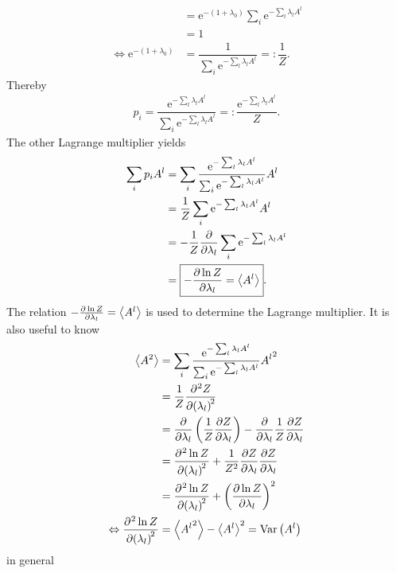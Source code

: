 \documentclass[a4paper,10pt]{article}
\numberwithin{equation}{section}
\begin{document}
\begin{multicols}{2}
\begin{align}
                 &= \text{e}^{-(1+\lambda _0)}\sum_{i}^{}\text{e}^{-\sum_{l}^{}\lambda _lA^l}\\
                 &= 1\\
  \Leftrightarrow \text{e}^{-(1+\lambda _0)} &= \dfrac{1}{\sum_{i}^{}\text{e}^{-\sum_{l}^{}\lambda _lA^l}}=:\dfrac{1}{Z}
.\end{align} 
Thereby
\begin{align} 
  \boxed{p_i=\dfrac{\text{e}^{-\sum_{l}^{}\lambda _lA^l}}{\sum_{i}^{}\text{e}^{-\sum_{l}^{}\lambda _lA^l}}=:\dfrac{\text{e}^{-\sum_{l}^{}\lambda _lA^l}}{Z}}
.\end{align} 
The other Lagrange multiplier yields
\begin{align} 
  \sum_{i}^{}p_iA^l &= \sum_{i}^{}\dfrac{\text{e}^{-\sum_{l}^{}\lambda _lA^l}}{\sum_{i}^{}\text{e}^{-\sum_{l}^{}\lambda _lA^l}}A^l\\
                      &= \dfrac{1}{Z}\sum_{i}^{}\text{e}^{-\sum_{l}^{}\lambda _lA^l}A^l\\
                      &= -\dfrac{1}{Z}\diffp*[]{\sum_{i}^{}\text{e}^{-\sum_{l}^{}\lambda _lA^l}}{\lambda _l}\\
                      &= \boxed{-\diffp[]{\ln Z}{\lambda _l} = \left\langle A^l\right\rangle }
.\end{align} 
The relation $-\diffp[]{\ln Z}{\lambda _l} = \left\langle A^l\right\rangle $ is used to determine the Lagrange multiplier.
It is also useful to know
\begin{align} 
  \left\langle A^2\right\rangle  &= \sum_{i}^{}\dfrac{\text{e}^{-\sum_{l}^{}\lambda _lA^l}}{\sum_{i}^{}\text{e}^{-\sum_{l}^{}\lambda _lA^l}}{A^l}^2\\
                                 &= \dfrac{1}{Z}\diffp[2]{Z}{\lambda _l}\\
                                 &= \diffp*[]{\left(\dfrac{1}{Z}\diffp[]{Z}{\lambda _l}\right)}{\lambda _l}-\diffp*[]{\dfrac{1}{Z}}{\lambda _l}\diffp[]{Z}{\lambda _l}\\
                                 &= \diffp[2]{\ln Z}{\lambda _l}+\dfrac{1}{Z^2}\diffp[]{Z}{\lambda _l}\diffp[]{Z}{\lambda _l}\\
                                 &= \diffp[2]{\ln Z}{\lambda _l}+\left(\diffp[]{\ln Z}{\lambda _l}\right)^2\\
  \Leftrightarrow \diffp[2]{\ln Z}{\lambda _l} &= \left\langle {A^l}^2\right\rangle -\left\langle A^l\right\rangle ^2 = \text{Var}\left(A^l\right)
\end{align}
in general
\begin{align} 

\end{align}
\end{multicols}
\end{document}
